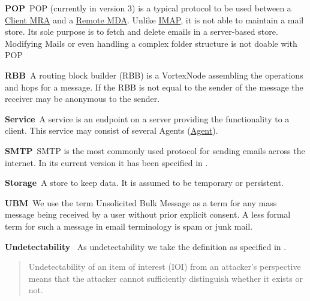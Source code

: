 \documentclass[a4paper,appendixprefix,pdfusetitle,twocolumn,fontsize=8pt,draft,DIV=calc,8pt]{\doctype} %
\newenvironment{entry}{\par\leavevmode\hangpara{1.5mm}{1}\ignorespaces}{\RaggedRight\par}
\newcommand*{\mainentry}[2]{{\bfseries{#1\label{def:#1}}}~#2\par}
\newcommand*{\defref}[1]{\hyperref[def:#1]{#1}}
\begin{document}
\begin{entry}
	\mainentry{POP}{POP (currently in version 3) is a typical protocol to be used between a \defref{Client MRA} and a \defref{Remote MDA}. Unlike \defref{IMAP}, it is not able to maintain a mail store. Its sole purpose is to fetch and delete emails in a server-based store. Modifying Mails or even handling a complex folder structure is not doable with POP}
\end{entry}

\begin{entry}
	\mainentry{RBB}{A routing block builder (RBB) is a VortexNode assembling the operations and hops for a message. If the RBB is not equal to the sender of the message the receiver may be anonymous to the sender.}
\end{entry}

\begin{entry}
	\mainentry{Service}{A service is an endpoint on a server providing the functionality to a client. This service may consist of several Agents (\defref{Agent}).}
\end{entry}

\begin{entry}
	\mainentry{SMTP}{SMTP is the most commonly used protocol for sending emails across the internet. In its current version it has been specified in \cite{RFC5321}.}
\end{entry}

\begin{entry}
	\mainentry{Storage}{A store to keep data. It is assumed to be temporary or persistent.}
\end{entry}

\begin{entry}
	\mainentry{UBM}{We use the term Unsolicited Bulk Message as a term for any mass message being received by a user without prior explicit consent. A less formal term for such a message in email terminology is spam or junk mail.}
\end{entry}

\begin{entry}
	\mainentry{Undetectability}{
		As undetectability we take the definition as specified in \cite{anonTerminology}.
		\begin{quote}
			Undetectability of an item of interest (IOI\index{Item of Interest}) from an attacker's perspective means that the
			attacker cannot sufficiently distinguish whether it exists or not.\omitted
		\end{quote}
	}
\end{entry}
\end{document}
